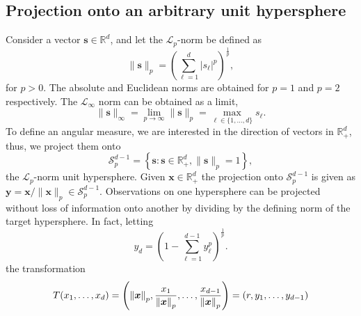 \subsection{Projection onto an arbitrary unit hypersphere}


Consider a vector $\bm{s} \in {\mathbb R}^d$, and let the $\mathcal{L}_p$-norm be defined as
  \begin{equation*}
    \lVert \bm{s} \rVert_p = \left({\textstyle\sum}_{\ell = 1}^d \lvert s_{\ell}\rvert^p\right)^{\frac{1}{p}},
  \end{equation*}
for $p>0$. The absolute and Euclidean norms are obtained for $p=1$ and $p=2$ respectively. 
The $\mathcal{L}_{\infty}$ norm can be obtained as a limit, 
  \begin{equation*}
    \lVert \bm{s} \rVert_{\infty}
      = \lim\limits_{p\to\infty} \lVert \bm{s} \rVert_p
      = \max_{\ell\in\lbrace1,\ldots,d\rbrace}s_{\ell}.
  \end{equation*}
To define an angular measure,  we are interested in the direction of
vectors in ${\mathbb R}_{+}^d$, thus, we project them onto
  \begin{equation*}
    \mathcal{S}_{p}^{d-1} = \left\lbrace \bm{s} : \bm{s} \in {\mathbb R}_{+}^{d}, \lVert \bm{s}\rVert_{p} = 1\right\rbrace,
  \end{equation*}
  the $\mathcal{L}_p$-norm unit hypersphere.
  Given $\bm{x}\in {\mathbb R}^d_+$ the projection onto $\mathcal{S}_{p}^{d-1}$ is given as
  $\bm{y} = \bm{x} / \lVert \bm{x}\rVert_p \in \mathcal{S}_{p}^{d-1}$.
  Observations on one hypersphere can be projected without loss of information onto another by
  dividing by the defining norm of the target hypersphere. In fact, letting 
  \begin{equation*}
    y_d = \left(1 - {\textstyle\sum}_{\ell = 1}^{d-1}y_{\ell}^p\right)^{\frac{1}{p}}.
  \end{equation*}
  the transformation
  \begin{equation}
    \label{eqn:pnormt}
    T(x_1,\ldots,x_d) = \left(\pnorm{\bm{x}}{p}, \frac{x_1}{\pnorm{\bm{x}}{p}},
                          \ldots , \frac{x_{d-1}}{\pnorm{\bm{x}}{p}}\right) = (r,y_1,\ldots,y_{d-1})
  \end{equation}

